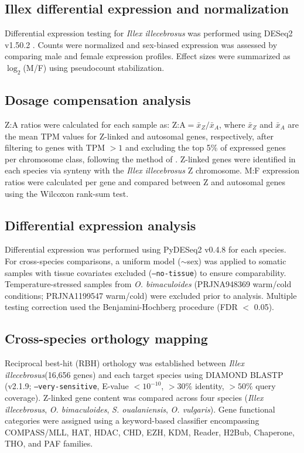 \documentclass[12pt]{article}
\newcommand{\citep}{\parencite}
\newcommand{\illex}{\textit{Illex illecebrosus}\xspace}
\begin{document}
\subsection*{Illex differential expression and normalization}

Differential expression testing for \illex was performed
using DESeq2 v1.50.2 \citep{Love2014DESeq2}.
Counts were normalized and sex-biased expression was assessed
by comparing male and female expression profiles.
Effect sizes were summarized as $\log_2$(M/F) using pseudocount stabilization.

\subsection*{Dosage compensation analysis}

Z:A ratios were calculated for each sample as:
$\text{Z:A} = \bar{x}_Z / \bar{x}_A$,
where $\bar{x}_Z$ and $\bar{x}_A$ are the mean TPM values
for Z-linked and autosomal genes, respectively,
after filtering to genes with TPM $> 1$
and excluding the top 5\% of expressed genes per chromosome class,
following the method of \textcite{papanicolaou2024z}.
Z-linked genes were identified in each species
via synteny with the \illex Z chromosome.
M:F expression ratios were calculated per gene
and compared between Z and autosomal genes
using the Wilcoxon rank-sum test.

\subsection*{Differential expression analysis}

Differential expression was performed using PyDESeq2 v0.4.8 \citep{muzellec2023pydeseq2}
for each species.
For cross-species comparisons,
a uniform model ($\sim$sex) was applied to somatic samples
with tissue covariates excluded (\texttt{--no-tissue})
to ensure comparability.
Temperature-stressed samples from \textit{O. bimaculoides}
(PRJNA948369 warm/cold conditions; PRJNA1199547 warm/cold)
were excluded prior to analysis.
Multiple testing correction used the Benjamini-Hochberg procedure (FDR $<$ 0.05).

\subsection*{Cross-species orthology mapping}

Reciprocal best-hit (RBH) orthology was established between \illex (16,656 genes)
and each target species using DIAMOND BLASTP \citep{buchfink2015diamond}
(v2.1.9; \texttt{--very-sensitive},
E-value $< 10^{-10}$, $>30\%$ identity, $>50\%$ query coverage).
Z-linked gene content was compared across four species
(\illex, \textit{O. bimaculoides}, \textit{S. oualaniensis}, \textit{O. vulgaris}).
Gene functional categories were assigned using a keyword-based classifier
encompassing COMPASS/MLL, HAT, HDAC, CHD, EZH, KDM, Reader, H2Bub,
Chaperone, THO, and PAF families.
\end{document}
